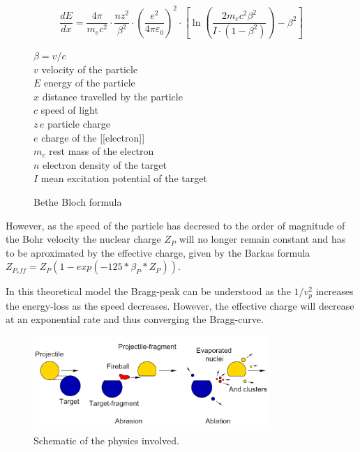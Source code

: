 \begin{figure}

\begin{equation}
 \frac{dE}{dx} = \frac{4 \pi}{m_e c^2} \cdot \frac{nz^2}{\beta^2} \cdot \left(\frac{e^2}{4\pi\varepsilon_0}\right)^2 \cdot \left[\ln \left(\frac{2m_e c^2 \beta^2}{I \cdot (1-\beta^2)}\right) - \beta^2\right]
\label{bethebloch}
\end{equation}

$\beta = v/c $\\
$v$ 
velocity of the particle \\
$E$ 
energy of the particle\\
$x$ 
distance travelled by the particle\\
$c$ 
speed of light\\
$z\,e$ 
particle charge\\
$e$ 
charge of the [[electron]]\\
$m_e$ 
rest mass of the electron\\
$n$ 
electron density of the target\\
$I$ 
mean excitation potential of the target\\

\caption{Bethe Bloch formula}
\end{figure} 

However, as the speed of the particle has decresed to the order of magnitude of the Bohr velocity the nuclear charge $Z_P$ will no longer remain constant and has to be aproximated by the effective charge, given by the Barkas formula $Z_{P_eff} = Z_P(1-exp(-125*\beta_{P}*Z_P))$.

In this theoretical model the Bragg-peak can be understood as the $1/v_{p}^2$ increases the energy-loss as the speed decreases. However, the effective charge will decrease at an exponential rate and thus converging the Bragg-curve.

\begin{figure}
\begin{center}
\includegraphics[width=0.8\textwidth]{images/ablationabration.png}  
\caption{Schematic of the physics involved.}
 \label{fig:ablationabration}
 \end{center}
 \end{figure}



